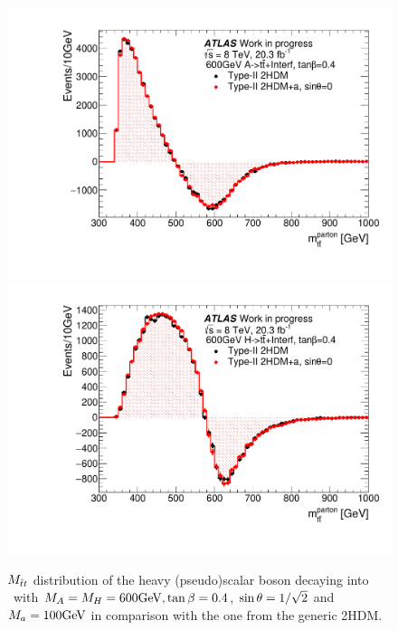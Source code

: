 \begin{figure}
\centering
\includegraphics[width=.48\textwidth]{texinputs/04_grid/figures/ttres/ttres_2HDMvs2HDMa_A.pdf}
\includegraphics[width=.48\textwidth]{texinputs/04_grid/figures/ttres/ttres_2HDMvs2HDMa_H.pdf}
\caption{$M_{\bar{t}t}$ distribution of the heavy (pseudo)scalar boson decaying into \ttbar\ with $M_{A}=M_{H}=600\textrm{GeV}, \tan\beta=0.4$, $\sin\theta=1/\sqrt{2}$ and $M_a=100\textrm{GeV}$ in comparison with the one from the generic 2HDM.}
\label{fig:ttres_2HDMvs2HDMa}
\end{figure}

